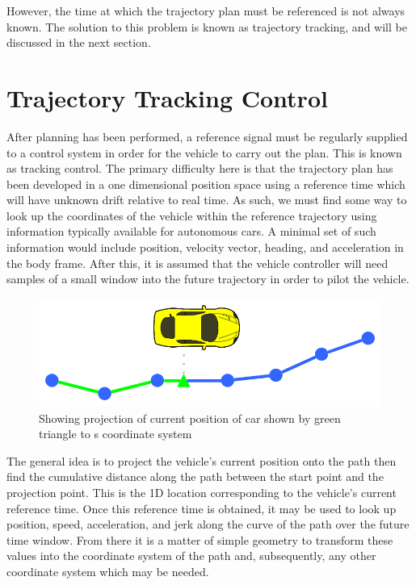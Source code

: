 \documentclass[letterpaper, 10 pt, conference]{ieeeconf}  %
\begin{document}
However, the time at which the trajectory plan must be referenced is not always known.
The solution to this problem is known as trajectory tracking, and will be discussed in the next section.


\section{Trajectory Tracking Control} \label{sec:trajectorytracking}

After planning has been performed, a reference signal must be regularly supplied to a control system in order for the vehicle to carry out the plan.
This is known as tracking control.
The primary difficulty here is that the trajectory plan has been developed in a one dimensional position space using a reference time which will have unknown drift relative to real time.
As such, we must find some way to look up the coordinates of the vehicle within the reference trajectory using information typically available for autonomous cars.
A minimal set of such information would include position, velocity vector, heading, and acceleration in the body frame.
After this, it is assumed that the vehicle controller will need samples of a small window into the future trajectory in order to pilot the vehicle.

\begin{figure}[thpb]
  \centering
  \includegraphics[width=0.5\columnwidth]{graphics/PathProjection.png}
  \caption{Showing projection of current position of car shown by green triangle to s coordinate system}
  \label{fig:cartos}
\end{figure}

The general idea is to project the vehicle's current position onto the path then find the cumulative distance along the path between the start point and the projection point.
This is the 1D location corresponding to the vehicle's current reference time.
Once this reference time is obtained, it may be used to look up position, speed, acceleration, and jerk along the curve of the path over the future time window.
From there it is a matter of simple geometry to transform these values into the coordinate system of the path and, subsequently, any other coordinate system which may be needed.
\end{document}

